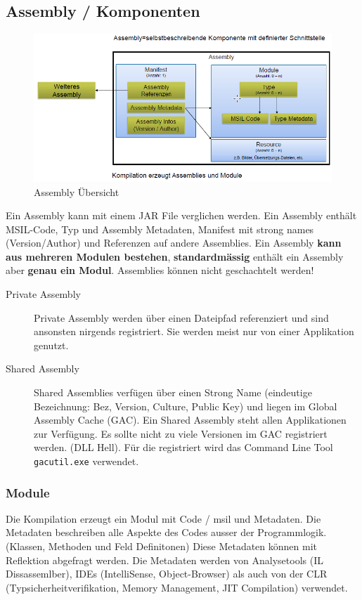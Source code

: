 \documentclass[
a4paper,
oneside,
10pt,
fleqn,
headsepline,
toc=listofnumbered, 
bibliography=totocnumbered]{scrartcl}
\begin{document}
\subsection{Assembly / Komponenten}
\begin{figure}[!ht]
	\centering
	\includegraphics[width=0.9\linewidth]{images/assembly}
	\caption{Assembly Übersicht}
	\label{fig:assembly}
\end{figure}

Ein Assembly kann mit einem JAR File verglichen werden. Ein Assembly enthält MSIL-Code, Typ und Assembly Metadaten, Manifest mit strong names (Version/Author) und Referenzen auf andere Assemblies. Ein Assembly \textbf{kann aus mehreren Modulen bestehen}, \textbf{standardmässig} enthält ein Assembly aber \textbf{genau ein Modul}. Assemblies können nicht geschachtelt werden!
\begin{description}
	\item[Private Assembly] Private Assembly werden über einen Dateipfad referenziert und sind ansonsten nirgends registriert. Sie werden meist nur von einer Applikation genutzt.
	\item[Shared Assembly] Shared Assemblies verfügen über einen Strong Name (eindeutige Bezeichnung: Bez, Version, Culture, Public Key) und liegen im Global Assembly Cache (GAC). Ein Shared Assembly steht allen Applikationen zur Verfügung. Es sollte nicht zu viele Versionen im GAC registriert werden. (DLL Hell). Für die registriert wird das Command Line Tool \lstinline|gacutil.exe| verwendet.
\end{description}

\subsubsection{Module}
Die Kompilation erzeugt ein Modul mit Code / \gls{msil} und Metadaten. Die Metadaten beschreiben alle Aspekte des Codes ausser der Programmlogik. (Klassen, Methoden und Feld Definitonen) Diese Metadaten können mit Reflektion abgefragt werden. Die Metadaten werden von Analysetools (IL Dissassemlber), IDEs (IntelliSense, Object-Browser) als auch von der CLR (Typsicherheitverifikation, Memory Management, JIT Compilation) verwendet.
\end{document}
